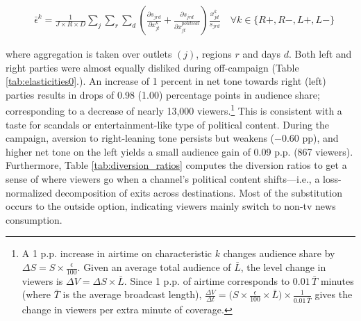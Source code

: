 \documentclass[12pt]{article}
\begin{document}
	
	
	
	\begin{equation}\label{eq:elasticities}
		\begin{aligned}
			& \bar{\epsilon}^k= \frac{1}{J\times R \times D}\sum_{j}\sum_{r} \sum_{d} \left(\frac{\partial s_{jrd}}{\partial x_{jt}^k} +  \frac{\partial s_{jrd}}{\partial x_{jt}^{political}} \right) \frac{x_{jd}^k}{s_{jrd}}    \quad \forall k \in \{R+,R-,L+,L-\}
		\end{aligned}
	\end{equation}             
	
	where aggregation is taken over outlets $(j)$, regions $r$ and days $d$.	Both left and right parties were almost equally disliked during off-campaign (Table \ref{tab:elasticities0}.). An increase of 1 percent in net tone  towards right (left) parties results in drops of 0.98 (1.00) percentage points in audience share; corresponding to a decrease of nearly 13,000 viewers.\footnote{A 1 p.p. increase in airtime on characteristic $k$ changes audience share by $\Delta S = S \times \tfrac{\epsilon}{100}$. Given an average total audience of $\bar{L}$, the level change in viewers is $\Delta V = \Delta S \times \bar{L}$. Since 1 p.p. of airtime corresponds to $0.01\,\bar{T}$ minutes (where $\bar{T}$ is the average broadcast length), $\tfrac{\Delta V}{\Delta t} = \bigl(S \times \tfrac{\epsilon}{100} \times \bar{L}\bigr) \times \tfrac{1}{0.01\,\bar{T}}$ gives the change in viewers per extra minute of coverage.} This is consistent with a taste for scandals or entertainment-like type of political content. During the campaign, aversion to right-leaning tone persists but weakens ($-0.60$ pp), and higher net tone on the left yields a small audience gain of 0.09 p.p. (867 viewers). Furthermore, Table \ref{tab:diversion_ratios} computes the diversion ratios to get a sense of where viewers go when a channel’s political content shifts—i.e., a loss-normalized decomposition of exits across destinations. Most of the substitution occurs to the outside option, indicating viewers mainly switch to non-tv news consumption.
	
\end{document}

